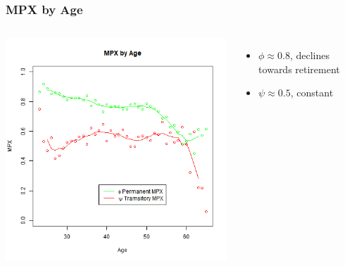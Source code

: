 \documentclass{beamer}
\begin{document}
{
	\frametitle{MPX by Age}
	\begin{columns}
		\centering
		\includegraphics[scale=0.35]{../Figures/MPXByAge_level_lincome_head.png}
		\begin{itemize}
			\item $\phi \approx 0.8$, declines towards retirement
			\item $\psi \approx 0.5$, constant
		\end{itemize}
	\end{columns} 	
}
\frame
\end{document}
